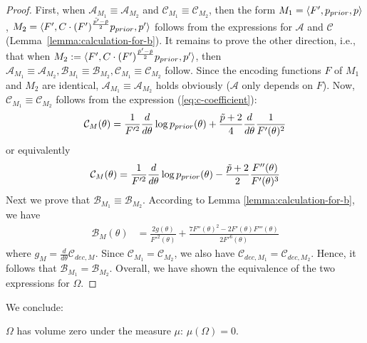 \begin{proof}
  First, when $\mathcal{A}_{M_1} \equiv \mathcal{A}_{M_2}$ and $\mathcal{C}_{M_1} \equiv \mathcal{C}_{M_2}$, then the form $M_1 = \langle F',p_{prior}, p\rangle $, $M_2 = \langle F',C \cdot (F')^{\frac{\tilde{p'}-\tilde{p}}{2}} p_{prior}, p'\rangle$ follows from the expressions for $\mathcal{A}$ and $\mathcal{C}$ (Lemma~\ref{lemma:calculation-for-b}).
    It remains to prove the other direction, i.e., that when $M_2 := \langle F',C \cdot (F')^{\frac{\tilde{p}'-\tilde{p}}{2}} p_{prior}, p'\rangle$, then
    $\mathcal{A}_{M_1} \equiv \mathcal{A}_{M_2}, \mathcal{B}_{M_1} \equiv \mathcal{B}_{M_2}, \mathcal{C}_{M_1} \equiv \mathcal{C}_{M_2}$ follow.
    Since the encoding functions $F$ of $M_1$ and $M_2$ are identical, $\mathcal{A}_{M_1} \equiv \mathcal{A}_{M_2}$ holds obviously ($\mathcal{A}$ only depends on $F$).
Now, $\mathcal{C}_{M_1} \equiv \mathcal{C}_{M_2}$ follows from the expression (\ref{eq:c-coefficient}):
\begin{equation}
    \mathcal{C}_M(\theta) = \frac{1}{F'^2} \frac{d}{d\theta} \log p_{prior}(\theta) + \frac{\tilde{p}+2}{4} \frac{d}{d\theta} \frac{1}{F'(\theta)^2} 
        \end{equation}
or equivalently
    \begin{equation*}
        \mathcal{C}_M(\theta) = \frac{1}{F'^2} \frac{d}{d\theta} \log p_{prior}(\theta) - \frac{\tilde{p}+2}{2}\frac{F''(\theta)}{F'(\theta)^3}
    \end{equation*}
    Next we prove that $\mathcal{B}_{M_1} \equiv \mathcal{B}_{M_2}$. According to Lemma \ref{lemma:calculation-for-b}, we have 
    \begin{align*}
    \mathcal{B}_M(\theta) &= \frac{2g(\theta)}{F'^2(\theta)} + \frac{7F''(\theta)^2 - 2F'(\theta)F'''(\theta)}{2F'^6(\theta)}
    \end{align*}
    where $g_M = \frac{d}{d\theta} \mathcal{C}_{dec,M}$.
    Since $\mathcal{C}_{M_1} = \mathcal{C}_{M_2}$, we also have $\mathcal{C}_{dec,M_1} = \mathcal{C}_{dec,M_2}$.
    Hence, it follows that 
    $\mathcal{B}_{M_1} = \mathcal{B}_{M_2}$. 
Overall, we have shown the equivalence of the two expressions for $\Omega$.
\end{proof}

We conclude:
\begin{corollary}\label{lemma:statements-omega}\label{lemma:measure-zero}
        $\Omega$ has volume zero under the measure $\mu$: $\mu(\Omega) = 0$.  
\end{corollary}



